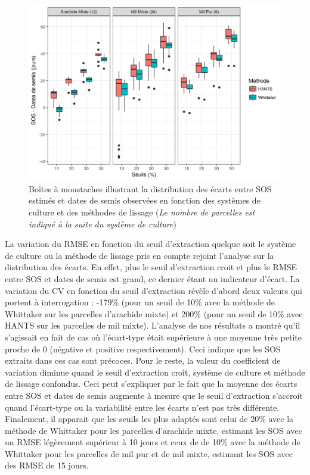 \begin{figure}[htbp]
 \begin{center}
  \includegraphics[scale=0.7]{resultats_discussions/SOS_Boxplot.png} 
 \end{center}
 \caption[Distribution des écarts entre SOS et dates de semis]{Boîtes à moustaches illustrant la distribution des écarts entre SOS estimés et dates de semis observées en fonction des systèmes de culture et des méthodes de lissage (\emph{Le nombre de parcelles est indiqué à la suite du système de culture})}
 \label{fig-sosboxplot}
\end{figure}

\newpage

La variation du RMSE en fonction du seuil d’extraction quelque soit le système de culture ou la méthode de lissage pris en compte rejoint l’analyse sur la distribution des écarts. En effet, plus le seuil d’extraction croit et plus le RMSE entre SOS et
dates de semis est grand, ce dernier étant un indicateur d’écart. La variation du CV en fonction du seuil d’extraction révèle d’abord deux valeurs qui portent à interrogation : -179\% (pour un seuil de 10\% avec la méthode de Whittaker sur les parcelles d’arachide mixte) et 200\% (pour un seuil de 10\% avec HANTS sur les parcelles de mil
mixte). L’analyse de nos résultats a montré qu’il s’agissait en fait de cas où l’écart-type était supérieure à une moyenne très petite proche de 0 (négative et positive respectivement). Ceci indique que les SOS extraits dans ces cas sont précoces. Pour le reste, la valeur du coefficient de variation diminue quand le seuil d’extraction croît, système de culture et méthode de lissage confondus. Ceci peut s’expliquer par le fait que la moyenne des écarts entre SOS et dates de semis augmente à mesure que le seuil d’extraction s’accroit quand l’écart-type ou la variabilité entre les écarts n’est pas très
différente. Finalement, il apparait que les seuils les plus adaptés sont celui de 20\% avec la méthode de Whittaker pour les parcelles d’arachide mixte, estimant les SOS avec un RMSE légèrement supérieur à 10 jours et ceux de de 10\% avec la méthode de Whittaker pour les parcelles de mil pur et de mil mixte, estimant les SOS avec des
RMSE de 15 jours.

